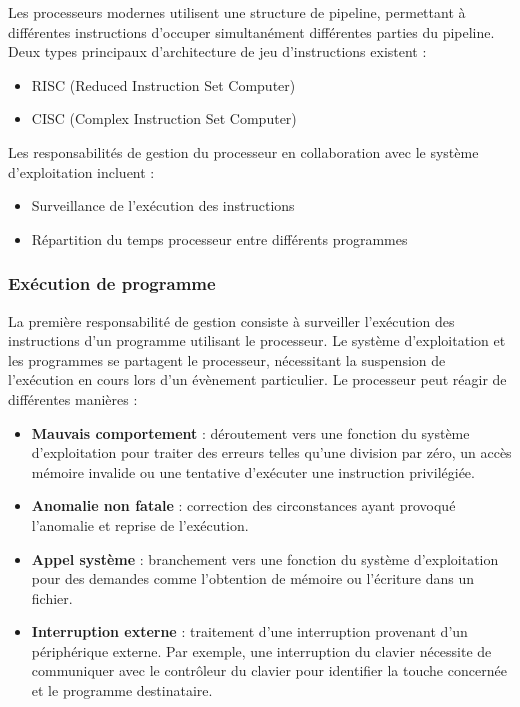 Les processeurs modernes utilisent une structure de pipeline, permettant à différentes instructions d'occuper simultanément différentes parties du pipeline. Deux types principaux d'architecture de jeu d'instructions existent :
\begin{itemize}
    \item RISC (Reduced Instruction Set Computer)
    \item CISC (Complex Instruction Set Computer)
\end{itemize}

Les responsabilités de gestion du processeur en collaboration avec le système d'exploitation incluent :
\begin{itemize}
    \item Surveillance de l'exécution des instructions
    \item Répartition du temps processeur entre différents programmes
\end{itemize}


\subsubsection{Exécution de programme}

La première responsabilité de gestion consiste à surveiller l'exécution des instructions d'un programme utilisant le processeur. Le système d'exploitation et les programmes se partagent le processeur, nécessitant la suspension de l'exécution en cours lors d'un évènement particulier. Le processeur peut réagir de différentes manières :

\begin{itemize}
    \item \textbf{Mauvais comportement} : déroutement vers une fonction du système d'exploitation pour traiter des erreurs telles qu'une division par zéro, un accès mémoire invalide ou une tentative d'exécuter une instruction privilégiée.
    \item \textbf{Anomalie non fatale} : correction des circonstances ayant provoqué l'anomalie et reprise de l'exécution.
    \item \textbf{Appel système} : branchement vers une fonction du système d'exploitation pour des demandes comme l'obtention de mémoire ou l'écriture dans un fichier.
    \item \textbf{Interruption externe} : traitement d'une interruption provenant d'un périphérique externe. Par exemple, une interruption du clavier nécessite de communiquer avec le contrôleur du clavier pour identifier la touche concernée et le programme destinataire.
\end{itemize}


